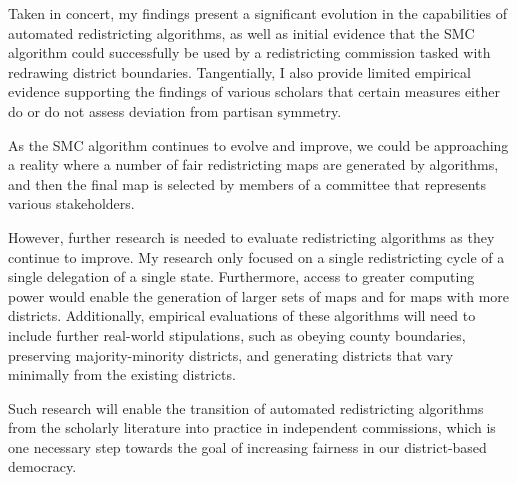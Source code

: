 Taken in concert, my findings present a significant evolution in the capabilities of automated redistricting algorithms, as well as initial evidence that the SMC algorithm could successfully be used by a redistricting commission tasked with redrawing district boundaries. Tangentially, I also provide limited empirical evidence supporting the findings of various scholars that certain measures either do or do not assess deviation from partisan symmetry.

As the SMC algorithm continues to evolve and improve, we could be approaching a reality where a number of fair redistricting maps are generated by algorithms, and then the final map is selected by members of a committee that represents various stakeholders.

However, further research is needed to evaluate redistricting algorithms as they continue to improve. My research only focused on a single redistricting cycle of a single delegation of a single state. Furthermore, access to greater computing power would enable the generation of larger sets of maps and for maps with more districts. Additionally, empirical evaluations of these algorithms will need to include further real-world stipulations, such as obeying county boundaries, preserving majority-minority districts, and generating districts that vary minimally from the existing districts. 

Such research will enable the transition of automated redistricting algorithms from the scholarly literature into practice in independent commissions, which is one necessary step towards the goal of increasing fairness in our district-based democracy. 